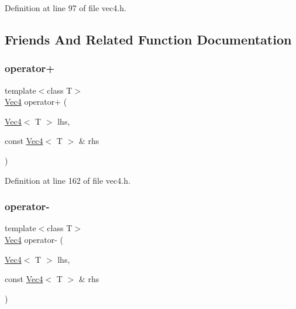 Definition at line 97 of file vec4.\+h.



\subsection{Friends And Related Function Documentation}
\mbox{\label{class_vec4_a33771ecce1909f4a57691fe6c9fc6373}} 
\subsubsection{\texorpdfstring{operator+}{operator+}}
{\footnotesize\ttfamily template$<$class T$>$ \\
\mbox{\hyperlink{class_vec4}{Vec4}} operator+ (\begin{DoxyParamCaption}\item[{\mbox{\hyperlink{class_vec4}{Vec4}}$<$ T $>$}]{lhs,  }\item[{const \mbox{\hyperlink{class_vec4}{Vec4}}$<$ T $>$ \&}]{rhs }\end{DoxyParamCaption})\hspace{0.3cm}{\ttfamily [friend]}}



Definition at line 162 of file vec4.\+h.

\mbox{\label{class_vec4_a31113e260c50ba3cd30e8a077e52de75}} 
\subsubsection{\texorpdfstring{operator-\/}{operator-}}
{\footnotesize\ttfamily template$<$class T$>$ \\
\mbox{\hyperlink{class_vec4}{Vec4}} operator-\/ (\begin{DoxyParamCaption}\item[{\mbox{\hyperlink{class_vec4}{Vec4}}$<$ T $>$}]{lhs,  }\item[{const \mbox{\hyperlink{class_vec4}{Vec4}}$<$ T $>$ \&}]{rhs }\end{DoxyParamCaption})\hspace{0.3cm}{\ttfamily [friend]}}



